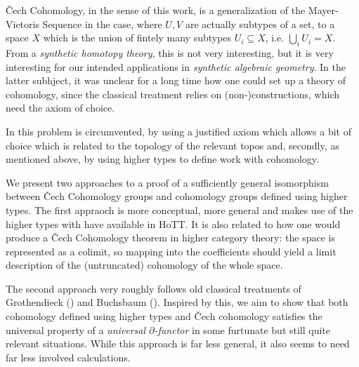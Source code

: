 \documentclass[letterpaper]{../util/easychair}
\newcommand{\notion}[1]{\emph{#1}\index{#1}}
\begin{document}
\v{C}ech Cohomology, in the sense of this work,
is a generalization of the Mayer-Vietoris Sequence in the case, where $U,V$ are actually subtypes of a set,
to a space $X$ which is the union of fintely many subtypes $U_i\subseteq X$, i.e. $\bigcup_{i}U_i=X$.
From a \emph{synthetic homotopy theory}, this is not very interesting,
but it is very interesting for our intended applications in \emph{synthetic algebraic geometry}.
In the latter subhject, it was unclear for a long time how one could set up a theory of cohomology,
since the classical treatment relies on (non-)constructions, which need the axiom of choice.

In \cite{draft} this problem is circumvented,
by using a justified axiom which allows a bit of choice which is related to the topology of the relevant topos
and, secondly, as mentioned above, by using higher types to define work with cohomology.

We present two approaches to a proof of a sufficiently general isomorphism between \v{C}ech Cohomology groups
and cohomology groups defined using higher types.
The first appraoch is more conceptual, more general and makes use of the higher types with have available in HoTT.
It is also related to how one would produce a \v{C}ech Cohomology theorem in higher category theory:
the space is represented as a colimit, so mapping into the coefficients should yield a limit description of
the (untruncated) cohomology of the whole space.

The second approach very roughly follows old classical treatments of Grothendieck (\cite{tohoku1957}) and Buchsbaum (\cite{buchsbaum}).
Inspired by this, we aim to show that both cohomology defined using higher types and \v{C}ech cohomology satisfies the universal property
of a \notion{universal $\partial$-functor} in some furtunate but still quite relevant situations.
While this approach is far less general, it also seems to need far less involved calculations.

\printbibliography
\end{document}
